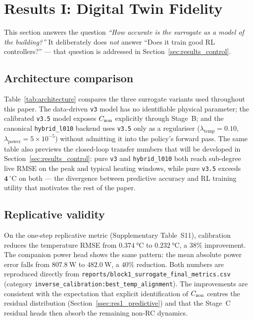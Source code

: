 \section{Results I: Digital Twin Fidelity}
\label{sec:results_fidelity}

This section answers the question \emph{``How accurate is the surrogate as
a model of the building?''} It deliberately does \emph{not} answer
``Does it train good RL controllers?'' --- that question is addressed in
Section~\ref{sec:results_control}.

\subsection{Architecture comparison}
\label{ssec:res1_architecture}

Table~\ref{tab:architecture} compares the three surrogate variants used
throughout this paper. The data-driven \texttt{v3} model has no
identifiable physical parameter; the calibrated \texttt{v3.5} model
exposes $C_{\mathrm{zon}}$ explicitly through Stage~B; and the canonical
\texttt{hybrid\_l010} backend uses \texttt{v3.5} only as a regulariser
($\lambda_{\mathrm{temp}}=0.10$, $\lambda_{\mathrm{power}}=5\times10^{-5}$)
without admitting it into the policy's forward pass. The same table
also previews the closed-loop transfer numbers that will be developed
in Section~\ref{sec:results_control}: pure \texttt{v3} and
\texttt{hybrid\_l010} both reach sub-degree live RMSE on the peak and
typical heating windows, while pure \texttt{v3.5} exceeds
$\mathbf{4\,^{\circ}\mathrm{C}}$ on both --- the divergence between
predictive accuracy and RL training utility that motivates the rest
of the paper.



\subsection{Replicative validity}
\label{ssec:res1_replicative}

On the one-step replicative metric (Supplementary Table~S11),
calibration reduces the temperature RMSE from
$\SI{0.374}{\celsius}$ to $\SI{0.232}{\celsius}$, a $38\%$
improvement. The companion power head shows the same pattern: the
mean absolute power error falls from $\SI{807.8}{\watt}$ to
$\SI{482.0}{\watt}$, a $40\%$ reduction. Both numbers are reproduced
directly from
\texttt{reports/block1\_surrogate\_final\_metrics.csv} (category
\texttt{inverse\_calibration:best\_temp\_alignment}). The
improvements are consistent with the expectation that explicit
identification of $C_{\mathrm{zon}}$ centres the residual distribution
(Section~\ref{ssec:res1_predictive}) and that the Stage~C residual
heads then absorb the remaining non-RC dynamics.

